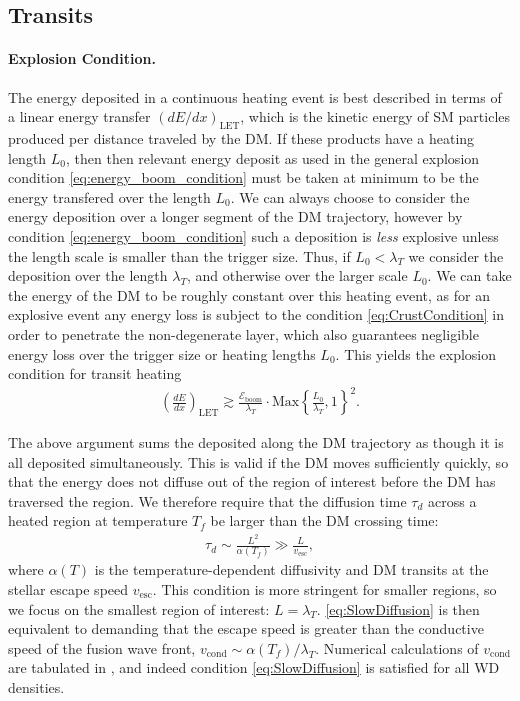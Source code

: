 \documentclass[preprintnumbers,amsmath,amssymb,prd, superscriptaddress,twocolumn]{revtex4}
\newcommand{\Eboom}{\mathcal{E}_\text{boom}}
\begin{document}
\subsection{Transits}

\paragraph{Explosion Condition.}
The energy deposited in a continuous heating event is best described in terms of a linear energy transfer $(dE/dx)_\text{LET}$, which is the kinetic energy of SM particles produced per distance traveled by the DM.
If these products have a heating length $L_0$, then then relevant energy deposit as used in the general explosion condition \eqref{eq:energy_boom_condition} must be taken at minimum to be the energy transfered over the length $L_0$.
We can always choose to consider the energy deposition over a longer segment of the DM trajectory, however by condition \eqref{eq:energy_boom_condition} such a deposition is \emph{less} explosive unless the length scale is smaller than the trigger size.
Thus, if $L_0 < \lambda_T$ we consider the deposition over the length $\lambda_T$, and otherwise over the larger scale $L_0$.
We can take the energy of the DM to be roughly constant over this heating event, as for an explosive event any energy loss is subject to the condition
\eqref{eq:CrustCondition} in order to penetrate the non-degenerate layer, which also guarantees negligible energy loss over the trigger size or heating lengths $L_0$.
This yields the explosion condition for transit heating
\begin{align}
\label{eq:transitexplosion}
  \left( \frac{d E}{d x} \right)_\text{LET} \gtrsim
  \frac{\Eboom}{\lambda_T} \cdot \text{Max}
  \left\{\frac{L_0}{\lambda_T}, 1 \right\}^2.
\end{align}

The above argument sums the deposited along the DM trajectory as though it is all deposited simultaneously.
This is valid if the DM moves sufficiently quickly, so that the energy does not diffuse out of the region of interest before the DM has traversed the region.
We therefore require that the diffusion time $\tau_d$ across a heated region at temperature $T_f$ be larger than the DM crossing time:
\begin{align}
  \tau_d \sim \frac{L^2}{\alpha(T_f)} \gg
  \frac{L}{v_\text{esc}},
\label{eq:SlowDiffusion}
\end{align}
where $\alpha(T)$ is the temperature-dependent diffusivity and DM transits at the stellar escape speed $v_\text{esc}$.
This condition is more stringent for smaller regions, so we focus on the smallest region of interest: $L = \lambda_T$.
\eqref{eq:SlowDiffusion} is then equivalent to demanding that the escape speed is greater than the conductive speed of the fusion wave front, $v_\text{cond} \sim \alpha(T_f) / \lambda_T$.
Numerical calculations of $v_\text{cond}$ are tabulated in \cite{Woosley}, and indeed condition \eqref{eq:SlowDiffusion} is satisfied for all WD densities.
\end{document}
